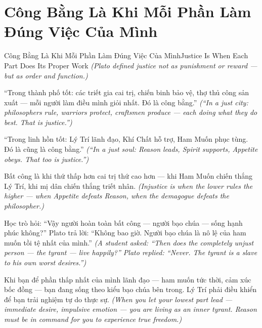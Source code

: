 \section{Công Bằng Là Khi Mỗi Phần Làm Đúng Việc Của Mình}
\begin{truyen}{Công Bằng Là Khi Mỗi Phần Làm Đúng Việc Của Mình}{Justice Is When Each Part Does Its Proper Work}
\textit{(Plato defined justice not as punishment or reward — but as order and function.)}

``Trong thành phố tốt: các triết gia cai trị, chiến binh bảo vệ, thợ thủ công sản xuất — mỗi người làm điều mình giỏi nhất. Đó là công bằng.''
\textit{(``In a just city: philosophers rule, warriors protect, craftsmen produce — each doing what they do best. That is justice.'')}

``Trong linh hồn tốt: Lý Trí lãnh đạo, Khí Chất hỗ trợ, Ham Muốn phục tùng. Đó là cũng là công bằng.''
\textit{(``In a just soul: Reason leads, Spirit supports, Appetite obeys. That too is justice.'')}

Bất công là khi thứ thấp hơn cai trị thứ cao hơn — khi Ham Muốn chiến thắng Lý Trí, khi mị dân chiến thắng triết nhân.
\textit{(Injustice is when the lower rules the higher — when Appetite defeats Reason, when the demagogue defeats the philosopher.)}

Học trò hỏi: ``Vậy người hoàn toàn bất công — người bạo chúa — sống hạnh phúc không?'' Plato trả lời: ``Không bao giờ. Người bạo chúa là nô lệ của ham muốn tồi tệ nhất của mình.''
\textit{(A student asked: ``Then does the completely unjust person — the tyrant — live happily?'' Plato replied: ``Never. The tyrant is a slave to his own worst desires.'')}

\end{truyen}

\begin{baihoc}
Khi bạn để phần thấp nhất của mình lãnh đạo — ham muốn tức thời, cảm xúc bốc đồng — bạn đang sống theo kiểu bạo chúa bên trong. Lý Trí phải điều khiển để bạn trải nghiệm tự do thực sự.
\textit{(When you let your lowest part lead — immediate desire, impulsive emotion — you are living as an inner tyrant. Reason must be in command for you to experience true freedom.)}
\end{baihoc}
\ngancach

